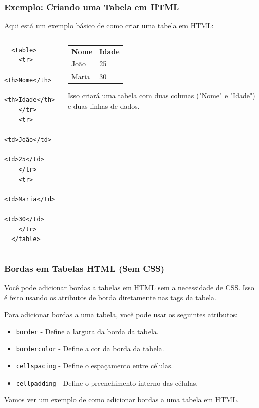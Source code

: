 \documentclass{beamer}
\begin{document}
\begin{frame}[fragile]
  \frametitle{Exemplo: Criando uma Tabela em HTML}

  Aqui está um exemplo básico de como criar uma tabela em HTML:

\begin{columns}
\begin{column}{0.5\textwidth}
   \begin{verbatim}
  <table>
    <tr>
      <th>Nome</th>
      <th>Idade</th>
    </tr>
    <tr>
      <td>João</td>
      <td>25</td>
    </tr>
    <tr>
      <td>Maria</td>
      <td>30</td>
    </tr>
  </table>
  \end{verbatim}
\end{column}
\begin{column}{0.5\textwidth}  %
    \begin{center}
     \begin{table}[]
    \begin{tabular}{ll}
    \textbf{Nome} & \textbf{Idade} \\
    João          & 25             \\
    Maria         & 30            
    \end{tabular}
    \end{table}
    \end{center}
    Isso criará uma tabela com duas colunas ("Nome" e "Idade") e duas linhas de dados.
\end{column}
\end{columns}
 

\end{frame}

\begin{frame}
  \frametitle{Bordas em Tabelas HTML (Sem CSS)}

  Você pode adicionar bordas a tabelas em HTML sem a necessidade de CSS. Isso é feito usando os atributos de borda diretamente nas tags da tabela.

  Para adicionar bordas a uma tabela, você pode usar os seguintes atributos:

  \begin{itemize}
    \item \texttt{border} - Define a largura da borda da tabela.
    \item \texttt{bordercolor} - Define a cor da borda da tabela.
    \item \texttt{cellspacing} - Define o espaçamento entre células.
    \item \texttt{cellpadding} - Define o preenchimento interno das células.
  \end{itemize}

  Vamos ver um exemplo de como adicionar bordas a uma tabela em HTML.
\end{frame}
\end{document}
